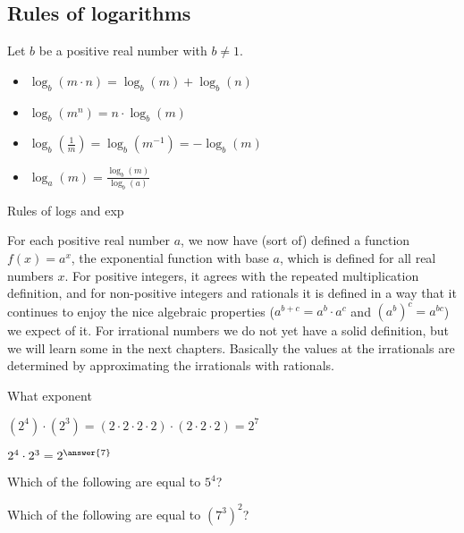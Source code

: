 \documentclass{ximera}
\begin{document}
\subsection{Rules of logarithms}
Let $b$ be a positive real number with $b\ne 1$.
\begin{itemize}
\item $\log_b(m\cdot n) = \log_b(m) + \log_b(n)$
\item $\log_b(m^n) = n\cdot \log_b(m)$
\item $\log_b\left(\frac{1}{m}\right) = \log_b(m^{-1}) = -\log_b(m)$
\item $\log_a(m) = \frac{\log_b(m)}{\log_b(a)}$
\end{itemize}

Rules of logs and exp

For each positive real number $a$, we now have (sort of) defined a
function $f(x) = a^x$, the exponential function with base $a$, which
is defined for all real numbers $x$.  For positive integers, it agrees
with the repeated multiplication definition, and for non-positive
integers and rationals it is defined in a way that it continues to
enjoy the nice algebraic properties ($a^{b+c} = a^b \cdot a^c$ and
$(a^b)^c = a^{bc}$) we expect of it.  For irrational numbers we do not
yet have a solid definition, but we will learn some in the next
chapters.  Basically the values at the irrationals are determined by
approximating the irrationals with rationals.


\begin{question}
What exponent 
  \begin{hint}
		$(2^4) \cdot (2^3) = (2 \cdot 2\cdot 2 \cdot 2) \cdot  (2 \cdot 2\cdot 2) = 2^7 $
	\end{hint}

	$2^4 \cdot 2^3 = 2^{\answer{7}}$
\end{question}


\begin{question}
	Which of the following are equal to $5^4$?
	\begin{selectAll}
	\end{selectAll}
\end{question}

\begin{question}
	Which of the following are equal to $(7^3)^2$?
	\begin{selectAll}
		\choice{$7^5$}
		\choice[correct]{$(7^3) \cdot (7^3)$}
		\choice[correct]{$7^6$}
		\choice{$7\cdot 7 \cdot 7 \cdot 7 \cdot 7$}
	\end{selectAll}
\end{question}
\end{document}
